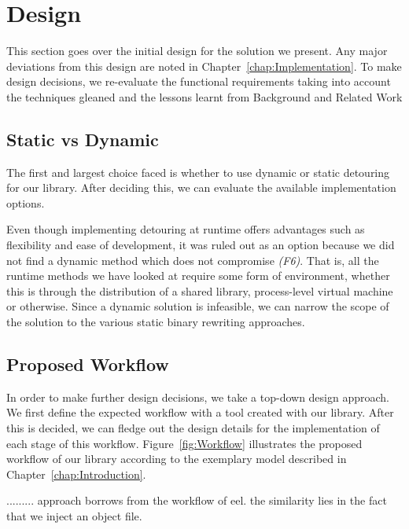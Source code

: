 \chapter{Design}\label{chap:Design}

This section goes over the initial design for the solution we present. Any major deviations from this design are noted in Chapter~\ref{chap:Implementation}. To make design decisions, we re-evaluate the functional requirements taking into account the techniques gleaned and the lessons learnt from Background and Related Work

\section{Static vs Dynamic}

The first and largest choice faced is whether to use dynamic or static detouring for our library. After deciding this, we can evaluate the available implementation options.

Even though implementing detouring at runtime offers advantages such as flexibility and ease of development, it was ruled out as an option because we did not find a dynamic method which does not compromise \emph{(F6)}. That is, all the runtime methods we have looked at require some form of environment, whether this is through the distribution of a shared library, process-level virtual machine or otherwise. Since a dynamic solution is infeasible, we can narrow the scope of the solution to the various static binary rewriting approaches.

\section{Proposed Workflow}

In order to make further design decisions, we take a top-down design approach. We first define the expected workflow with a tool created with our library. After this is decided, we can fledge out the design details for the implementation of each stage of this workflow. Figure~\ref{fig:Workflow} illustrates the proposed workflow of our library according to the exemplary model described in Chapter~\ref{chap:Introduction}.

.........
approach borrows from the workflow of eel. the similarity lies in the fact that we inject an object file.


